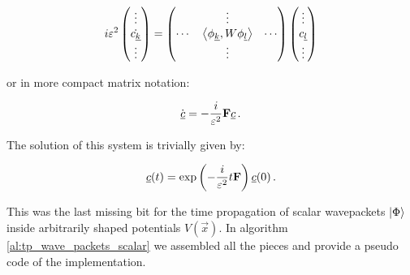 \begin{equation*}
  i\varepsilon^2
  \begin{pmatrix}
    \vdots \\
    \dot{c_{\underline{k}}} \\
    \vdots
  \end{pmatrix}
  =
  \begin{pmatrix}
    {}     & \vdots                                  & {} \\
    \cdots & \left\langle \phi_{\underline{k}} , W \phi_{\underline{l}} \right\rangle & \cdots \\
    {}     & \vdots                                  & {}
  \end{pmatrix}
  \begin{pmatrix}
    \vdots \\
    c_{\underline{l}} \\
    \vdots
  \end{pmatrix}
\end{equation*}

or in more compact matrix notation:

\begin{equation}
  \dot{\underline{c}} = -\frac{i}{\varepsilon^2} \mathbf{F} \underline{c} \,.
\end{equation}

The solution of this system is trivially given by:

\begin{equation} \label{eq:update_scheme_coeff}
  \underline{c}(t) = \exp\left(-\frac{i}{\varepsilon^2} t \mathbf{F}\right) \underline{c}(0) \,.
\end{equation}

This was the last missing bit for the time propagation of scalar wavepackets
$\Ket{\Phi}$ inside arbitrarily shaped potentials $V(\vec{x})$. In algorithm
\ref{al:tp_wave_packets_scalar} we assembled all the pieces and provide a pseudo
code of the implementation.


